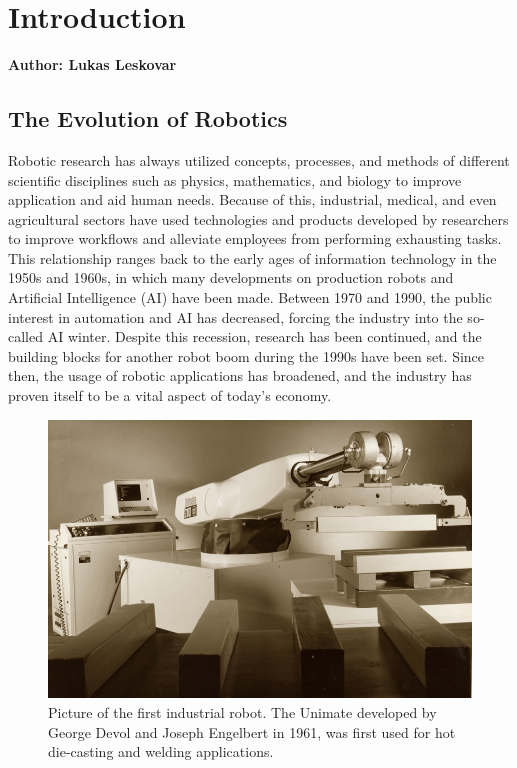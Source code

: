 \chapter{Introduction}

\textbf{Author: Lukas Leskovar}

\vspace{2mm}

\section{The Evolution of Robotics}


Robotic research has always utilized concepts, processes, and methods of different scientific disciplines such as physics, mathematics, and biology to improve application and aid human needs. Because of this, industrial, medical, and even agricultural sectors have used technologies and products developed by researchers to improve workflows and alleviate employees from performing exhausting tasks. This relationship ranges back to the early ages of information technology in the 1950s and 1960s, in which many developments on production robots and Artificial Intelligence (AI) have been made.
Between 1970 and 1990, the public interest in automation and AI has decreased, forcing the industry into the so-called AI winter. Despite this recession, research has been continued, and the building blocks for another robot boom during the 1990s have been set. Since then, the usage of robotic applications has broadened, and the industry has proven itself to be a vital aspect of today's economy.

\begin{figure}
	\centering
	\includegraphics[width=0.7\linewidth]{img/unimate}
	\caption{
		Picture of the first industrial robot. The Unimate developed by George Devol and Joseph Engelbert in 1961, was first used for hot die-casting and welding applications.\protect\footnotemark[1]
	}
	\label{fig:unimate}
\end{figure}
\addtocounter{footnote}{+1}

